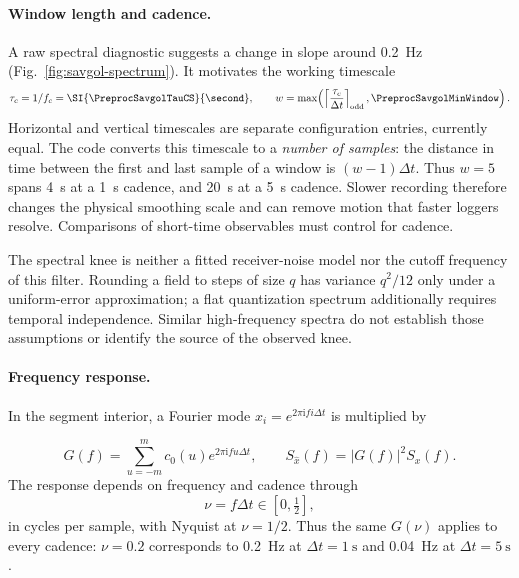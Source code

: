 \paragraph{Window length and cadence.}
A raw spectral diagnostic suggests a change in slope around \SI{0.2}{\hertz}
(Fig.~\ref{fig:savgol-spectrum}). It motivates the working timescale
\begin{equation}
 \tau_c=1/f_c=\SI{\PreprocSavgolTauCS}{\second},\qquad
 w=\max\!\left(\left\lceil\frac{\tau_c}{\Delta t}\right\rceil_{\mathrm{odd}},
               \PreprocSavgolMinWindow\right).
 \label{eq:savgol-window}
\end{equation}
\label{eq:savgol-tauc}
Horizontal and vertical timescales are separate configuration entries, currently equal.
The code converts this timescale to a \emph{number of samples}: the distance in time
between the first and last sample of a window is $(w-1)\Delta t$. Thus $w=5$ spans
\SI{4}{\second} at a \SI{1}{\second} cadence, and \SI{20}{\second} at a
\SI{5}{\second} cadence. Slower recording therefore changes the physical smoothing
scale and can remove motion that faster loggers resolve. Comparisons of short-time
observables must control for cadence.

The spectral knee is neither a fitted receiver-noise model nor the cutoff frequency
of this filter. Rounding a field to
steps of size $q$ has variance $q^2/12$ only under a uniform-error approximation;
a flat quantization spectrum additionally requires temporal independence. Similar
high-frequency spectra do not establish those assumptions or identify the source of
the observed knee.

\paragraph{Frequency response.}
In the segment interior, a Fourier mode
$x_i=e^{2\pi\mathrm{i}fi\Delta t}$ is multiplied by

\begin{equation}
 G(f)=\sum_{u=-m}^{m}c_0(u)e^{2\pi\mathrm{i}fu\Delta t},\qquad
 S_{\widehat x}(f)=|G(f)|^2 S_x(f).
 \label{eq:savgol-response}
\end{equation}
The response depends on frequency and cadence through
\begin{equation}
 \nu=f\Delta t\in[0,\tfrac12],
 \label{eq:savgol-nu}
\end{equation}
in cycles per sample, with Nyquist at $\nu=1/2$. Thus the same $G(\nu)$ applies to
every cadence: $\nu=0.2$ corresponds to \SI{0.2}{\hertz} at
$\Delta t=\SI{1}{\second}$ and \SI{0.04}{\hertz} at
$\Delta t=\SI{5}{\second}$.

